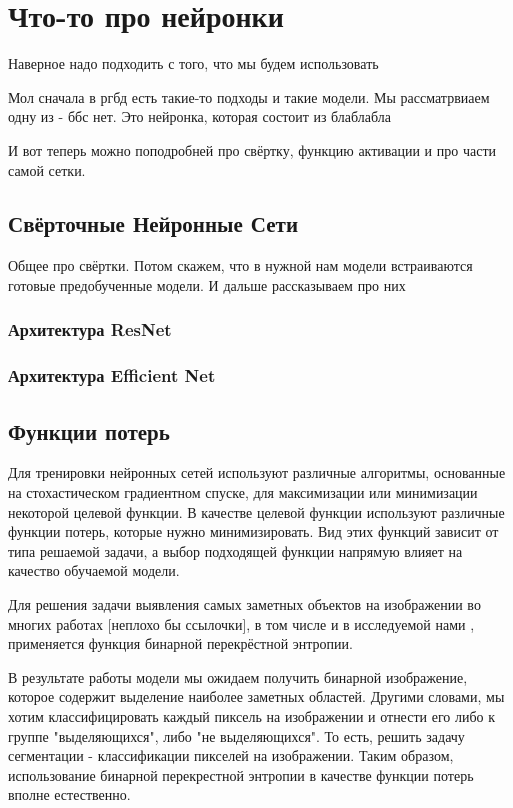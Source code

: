 \section{Что-то про нейронки}

Наверное надо подходить с того, что мы будем использовать 

Мол сначала в ргбд есть такие-то подходы и такие модели. Мы рассматрвиаем одну из - ббс нет. Это нейронка, которая состоит из блаблабла

И вот теперь можно поподробней про свёртку, функцию активации и про части самой сетки.


\subsection{Свёрточные Нейронные Сети}
Общее про свёртки.
Потом скажем, что в нужной нам модели встраиваются готовые предобученные модели. И дальше рассказываем про них
\subsubsection{Архитектура ResNet}
\subsubsection{Архитектура Efficient Net}

\subsection{Функции потерь}

Для тренировки нейронных сетей используют различные алгоритмы, основанные на стохастическом градиентном спуске,
для максимизации или минимизации некоторой целевой функции. В качестве целевой функции используют различные функции потерь, 
которые нужно минимизировать. Вид этих функций зависит от типа решаемой задачи, а выбор подходящей функции напрямую влияет на 
качество обучаемой модели. 

Для решения задачи выявления самых заметных объектов на изображении 
во многих работах [неплохо бы ссылочки], в том числе и в исследуемой нами \cite{BBS}, применяется функция бинарной перекрёстной энтропии.

В результате работы модели мы ожидаем получить бинарной изображение, которое содержит выделение наиболее заметных областей. 
Другими словами, мы хотим классифицировать каждый пиксель на изображении и отнести его либо к группе "выделяющихся", либо "не выделяющихся". То есть,
решить задачу сегментации - классификации пикселей на изображении. Таким образом, использование бинарной перекрестной энтропии 
в качестве функции потерь вполне естественно.

